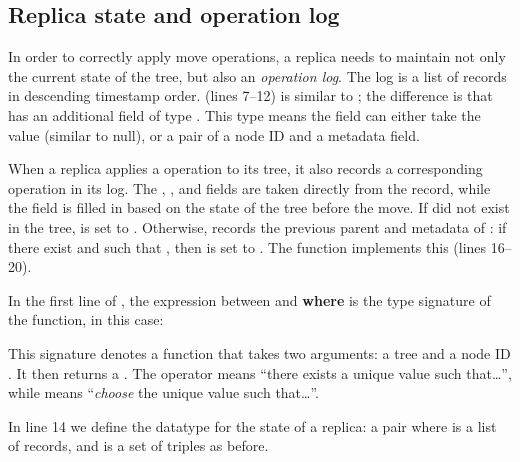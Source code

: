 \documentclass[10pt,journal,compsoc]{IEEEtran}
\begin{document}
\subsection{Replica state and operation log}\label{sec:state-log}

In order to correctly apply move operations, a replica needs to maintain not only the current state of the tree, but also an \emph{operation log}.
The log is a list of  records in descending timestamp order.
 (lines 7--12) is similar to ; the difference is that  has an additional field  of type .
This  type means the field can either take the value  (similar to null), or a pair of a node ID and a metadata field.

When a replica applies a  operation to its tree, it also records a corresponding  operation in its log.
The , ,  and  fields are taken directly from the  record, while the  field is filled in based on the state of the tree before the move.
If  did not exist in the tree,  is set to .
Otherwise,  records the previous parent and metadata of : if there exist  and  such that , then  is set to .
The  function implements this (lines 16--20).

In the first line of , the expression between \isa{::} and \textbf{where} is the type signature of the function, in this case:
\begin{quote}
\end{quote}
This signature denotes a function that takes two arguments: a tree  and a node ID .
It then returns a .
The operator  means ``there exists a unique value  such that\dots'', while  means ``\emph{choose} the unique value  such that\ldots''.

In line 14 we define the datatype for the state of a replica: a pair  where  is a list of  records, and  is a set of  triples as before.
\end{document}
